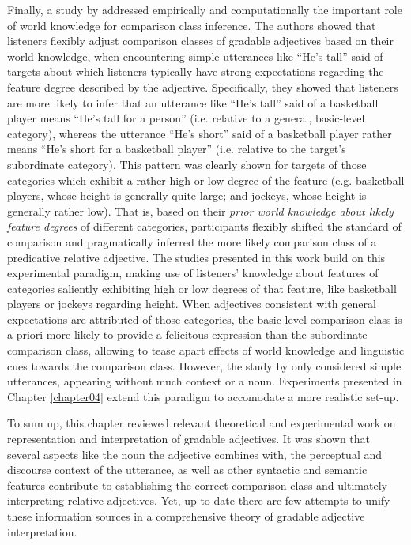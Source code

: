 Finally, a study by \textcite{tessler2017warm} addressed empirically and computationally the important role of world knowledge for comparison class inference. The authors showed that listeners flexibly adjust comparison classes of gradable adjectives based on their world knowledge, when encountering simple utterances like “He’s tall” said of targets about which listeners typically have strong expectations regarding the feature degree described by the adjective. Specifically, they showed that listeners are more likely to infer that an utterance like “He’s tall” said of a basketball player means “He’s tall for a person” (i.e. relative to a general, basic-level category), whereas the utterance “He’s short” said of a basketball player rather means “He’s short for a basketball player” (i.e. relative to the target’s subordinate category). This pattern was clearly shown for targets of those categories which exhibit a rather high or low degree of the feature (e.g. basketball players, whose height is generally quite large; and jockeys, whose height is generally rather low). That is, based on their \emph{prior world knowledge about likely feature degrees} of different categories, participants flexibly shifted the standard of comparison and pragmatically inferred the more likely comparison class of a predicative relative adjective. 
The studies presented in this work build on this experimental paradigm, making use of listeners’ knowledge about features of categories saliently exhibiting high or low degrees of that feature, like basketball players or jockeys regarding height. When adjectives consistent with general expectations are attributed of those categories, the basic-level comparison class is a priori more likely to provide a felicitous expression than the subordinate comparison class, allowing to tease apart effects of world knowledge and linguistic cues towards the comparison class. 
However, the study by \textcite{tessler2017warm} only considered simple utterances, appearing without much context or a noun. Experiments presented in Chapter \ref{chapter04} extend this paradigm to accomodate a more realistic set-up. 

To sum up, this chapter reviewed relevant theoretical and experimental work on representation and interpretation of gradable adjectives. It was shown that several aspects like the noun the adjective combines with, the perceptual and discourse context of the utterance, as well as other syntactic and semantic features contribute to establishing the correct comparison class and ultimately interpreting relative adjectives. Yet, up to date there are few attempts to unify these information sources in a comprehensive theory of gradable adjective interpretation.  